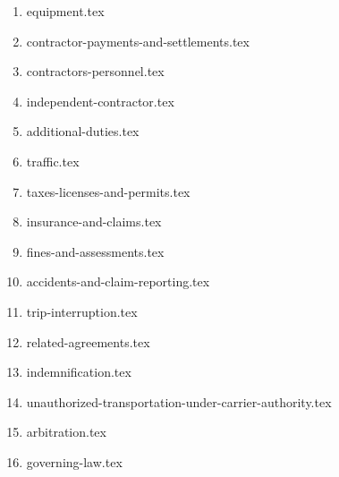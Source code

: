 \begin{enumerate}
    \item {equipment.tex}
    \item {contractor-payments-and-settlements.tex}
    \item {contractors-personnel.tex}
    \item {independent-contractor.tex}
    \item {additional-duties.tex}
    \item {traffic.tex}
    \item {taxes-licenses-and-permits.tex}
    \item {insurance-and-claims.tex}
    \item {fines-and-assessments.tex}
    \item {accidents-and-claim-reporting.tex}
    \item {trip-interruption.tex}
    \item {related-agreements.tex}
    \item {indemnification.tex}
    \item {unauthorized-transportation-under-carrier-authority.tex}
    \item {arbitration.tex}
    \item {governing-law.tex}
\end{enumerate}